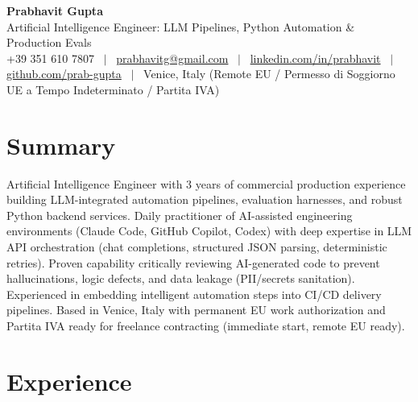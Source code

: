 \documentclass[a4paper,10pt]{article}
\begin{document}
\begin{minipage}[c]{0.80\textwidth}
  {\Huge\bfseries Prabhavit Gupta}\\[3pt]
  {\color{accent}\large Artificial Intelligence Engineer: LLM Pipelines, Python Automation \& Production Evals}\\[6pt]
  {\footnotesize +39 351 610 7807 ~$\vert$~
  \href{mailto:prabhavitg@gmail.com}{prabhavitg@gmail.com} ~$\vert$~
  \href{https://www.linkedin.com/in/prabhavit/}{linkedin.com/in/prabhavit} ~$\vert$~
  \href{https://github.com/prab-gupta}{github.com/prab-gupta} ~$\vert$~
  Venice, Italy (Remote EU / Permesso di Soggiorno UE a Tempo Indeterminato / Partita IVA)}
\end{minipage}\hfill

\section{Summary}
Artificial Intelligence Engineer with 3 years of commercial production experience building LLM-integrated automation pipelines, evaluation harnesses, and robust Python backend services. Daily practitioner of AI-assisted engineering environments (Claude Code, GitHub Copilot, Codex) with deep expertise in LLM API orchestration (chat completions, structured JSON parsing, deterministic retries). Proven capability critically reviewing AI-generated code to prevent hallucinations, logic defects, and data leakage (PII/secrets sanitation). Experienced in embedding intelligent automation steps into CI/CD delivery pipelines. Based in Venice, Italy with permanent EU work authorization and Partita IVA ready for freelance contracting (immediate start, remote EU ready).

\section{Experience}
\end{document}

